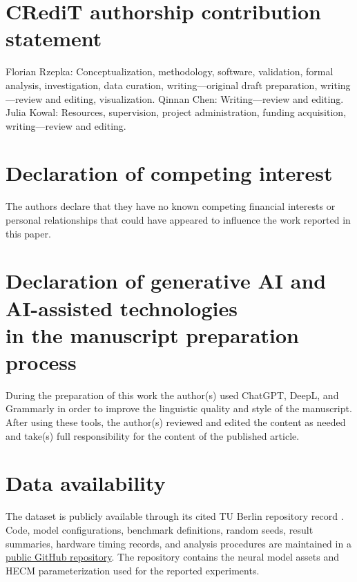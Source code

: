 \documentclass[review,nopreprintline]{elsarticle}
\newif\ifanonsubmission
\begin{document}
\section*{CRediT authorship contribution statement}
\ifanonsubmission
The author contribution statement is provided in the non-blinded submission materials.
\else
Florian Rzepka: Conceptualization, methodology, software, validation, formal analysis, investigation, data curation, writing---original draft preparation, writing---review and editing, visualization. Qinnan Chen: Writing---review and editing. Julia Kowal: Resources, supervision, project administration, funding acquisition, writing---review and editing.
\fi

\section*{Declaration of competing interest}
The authors declare that they have no known competing financial interests or personal relationships that could have appeared to influence the work reported in this paper.

\section*{Declaration of generative AI and AI-assisted technologies\\in the manuscript preparation process}
During the preparation of this work the author(s) used ChatGPT, DeepL, and Grammarly in order to improve the linguistic quality and style of the manuscript. After using these tools, the author(s) reviewed and edited the content as needed and take(s) full responsibility for the content of the published article.

\section*{Data availability}
\ifanonsubmission
Repository links that identify the authors are omitted for double-blind review and are provided in the non-blinded submission materials.
\else
The dataset is publicly available through its cited TU Berlin repository record \cite{LFP_DoE_Cycle_Aging_Dataset}. Code, model configurations, benchmark definitions, random seeds, result summaries, hardware timing records, and analysis procedures are maintained in a \href{https://github.com/FRzepka/1_SCRIPTS}{public GitHub repository}. The repository contains the neural model assets and HECM parameterization used for the reported experiments.
\fi



\end{document}
